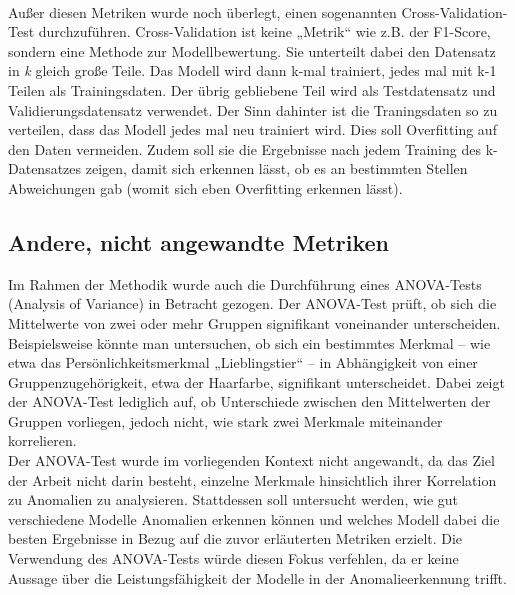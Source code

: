 \documentclass[a4paper,12pt]{article}
\begin{document}
	\\[0.5em]
	Außer diesen Metriken wurde noch überlegt, einen sogenannten Cross-Validation-Test durchzuführen. Cross-Validation ist keine „Metrik“ wie z.B. der F1-Score, sondern eine Methode zur Modellbewertung. Sie unterteilt dabei den Datensatz in \textit{k} gleich große Teile. Das Modell wird dann k-mal trainiert, jedes mal mit k-1 Teilen als Trainingsdaten. Der übrig gebliebene Teil wird als Testdatensatz und Validierungsdatensatz verwendet. Der Sinn dahinter ist die Traningsdaten so zu verteilen, dass das Modell jedes mal neu trainiert wird. Dies soll Overfitting auf den Daten vermeiden. Zudem soll sie die Ergebnisse nach jedem Training des k-Datensatzes zeigen, damit sich erkennen lässt, ob es an bestimmten Stellen Abweichungen gab
	(womit sich eben Overfitting erkennen lässt).
	
	\subsection{Andere, nicht angewandte Metriken}
	Im Rahmen der Methodik wurde auch die Durchführung eines ANOVA-Tests (Analysis of Variance) in Betracht gezogen. Der ANOVA-Test prüft, ob sich die Mittelwerte von zwei oder mehr Gruppen signifikant voneinander unterscheiden. 
	\\[0.5em]
	Beispielsweise könnte man untersuchen, ob sich ein bestimmtes Merkmal – wie etwa das Persönlichkeitsmerkmal „Lieblingstier“ – in Abhängigkeit von einer Gruppenzugehörigkeit, etwa der Haarfarbe, signifikant unterscheidet. Dabei zeigt der ANOVA-Test lediglich auf, ob Unterschiede zwischen den Mittelwerten der Gruppen vorliegen, jedoch nicht, wie stark zwei Merkmale miteinander korrelieren.
	\\[0.5em]
	Der ANOVA-Test wurde im vorliegenden Kontext nicht angewandt, da das Ziel der Arbeit nicht darin besteht, einzelne Merkmale hinsichtlich ihrer Korrelation zu Anomalien zu analysieren. Stattdessen soll untersucht werden, wie gut verschiedene Modelle Anomalien erkennen können und welches Modell dabei die besten Ergebnisse in Bezug auf die zuvor erläuterten Metriken erzielt. Die Verwendung des ANOVA-Tests würde diesen Fokus verfehlen, da er keine Aussage über die Leistungsfähigkeit der Modelle in der Anomalieerkennung trifft.
	
\end{document}
